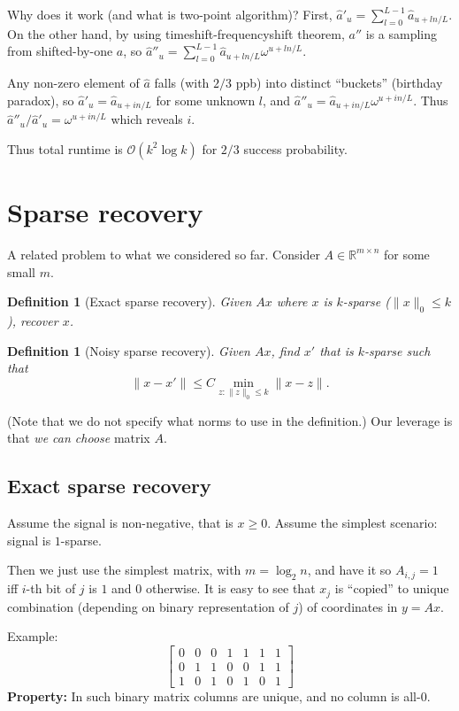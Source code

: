 \documentclass[11pt]{article}
\newtheorem{definition}[theorem]{Definition}
\newcommand{\bigo}{\mathcal{O}}
\begin{document}
Why does it work (and what is two-point algorithm)?
First, $\hat{a}'_u = \sum_{l=0}^{L-1} \hat{a}_{u + l n/L}$. On the other hand, by using timeshift-frequencyshift theorem, $a''$ is a sampling from shifted-by-one $a$, so $\hat{a}''_u = \sum_{l=0}^{L-1} \hat{a}_{u+ln/L} \omega^{u+ln/L}$.


Any non-zero element of $\hat{a}$ falls (with $2/3$ ppb) into distinct ``buckets'' (birthday paradox), so $\hat{a}'_u = \hat{a}_{u+ in/L}$ for some unknown $l$, and $\hat{a}''_u = \hat{a}_{u+in/L} \omega^{u+in/L}$. Thus
$\hat{a}''_u / \hat{a}'_u = \omega^{u+in/L}$ which reveals $i$.

Thus total runtime is $\bigo(k^2 \log k)$ for $2/3$ success probability.

\section{Sparse recovery}
A related problem to what we considered so far. Consider $A \in \mathbb{R}^{m \times n}$ for some small $m$.

\begin{definition}[Exact sparse recovery]
Given $Ax$ where $x$ is $k$-sparse ($\|x\|_0 \le k$), recover $x$.
\end{definition}

\begin{definition}[Noisy sparse recovery]
Given $Ax$, find $x'$ that is $k$-sparse such that
$$\|x - x'\| \le C \min_{z : \|z\|_0 \le k} \|x - z\|.$$
\end{definition}
(Note that we do not specify what norms to use in the definition.)
Our leverage is that \emph{we can choose} matrix $A$.

\subsection{Exact sparse recovery}
Assume the signal is non-negative, that is $x \ge 0$. Assume the simplest scenario: signal is $1$-sparse.

Then we just use the simplest matrix, with $m = \log_2 n$, and have it so $A_{i,j} = 1$ iff $i$-th bit of $j$ is $1$ and $0$ otherwise. It is easy to see that $x_j$ is ``copied'' to unique combination (depending on binary representation of $j$) of coordinates in $y = Ax$.

Example:
$$\begin{bmatrix} 0 & 0 & 0 & 1 & 1 & 1 & 1 \\ 0 & 1 & 1 & 0 & 0 & 1 & 1 \\ 1 & 0 & 1 & 0 & 1 & 0 & 1 \end{bmatrix}
$$
\textbf{Property:} In such binary matrix columns are unique, and no column is all-0.
\end{document}
